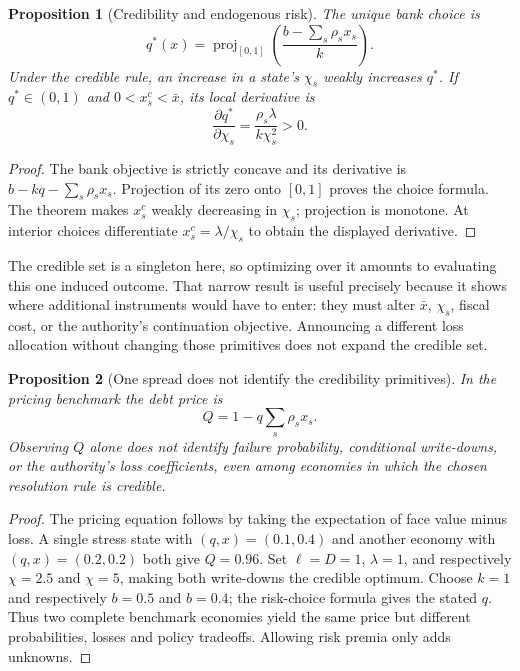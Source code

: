 \documentclass[11pt]{article}
\newtheorem{proposition}{Proposition}
\theoremstyle{definition}
\begin{document}
\begin{proposition}[Credibility and endogenous risk]
The unique bank choice is
\[
 q^*(x)=\operatorname{proj}_{[0,1]}
 \left(\frac{b-\sum_s\rho_sx_s}{k}\right).
\]
Under the credible rule, an increase in a state's $\chi_s$ weakly increases $q^*$. If $q^*\in(0,1)$ and $0<x_s^c<\bar x$, its local derivative is
\[
 \frac{\partial q^*}{\partial\chi_s}
       =\frac{\rho_s\lambda}{k\chi_s^2}>0.
\]
\end{proposition}
\begin{proof}
The bank objective is strictly concave and its derivative is $b-kq-\sum_s\rho_sx_s$. Projection of its zero onto $[0,1]$ proves the choice formula. The theorem makes $x_s^c$ weakly decreasing in $\chi_s$; projection is monotone. At interior choices differentiate $x_s^c=\lambda/\chi_s$ to obtain the displayed derivative.
\end{proof}
The credible set is a singleton here, so optimizing over it amounts to evaluating this one induced outcome. That narrow result is useful precisely because it shows where additional instruments would have to enter: they must alter $\bar x$, $\chi_s$, fiscal cost, or the authority's continuation objective. Announcing a different loss allocation without changing those primitives does not expand the credible set.

\begin{proposition}[One spread does not identify the credibility primitives]
In the pricing benchmark the debt price is
\[
 Q=1-q\sum_s\rho_sx_s.
\]
Observing $Q$ alone does not identify failure probability, conditional write-downs, or the authority's loss coefficients, even among economies in which the chosen resolution rule is credible.
\end{proposition}
\begin{proof}
The pricing equation follows by taking the expectation of face value minus loss. A single stress state with $(q,x)=(0.1,0.4)$ and another economy with $(q,x)=(0.2,0.2)$ both give $Q=0.96$. Set $\ell=D=1$, $\lambda=1$, and respectively $\chi=2.5$ and $\chi=5$, making both write-downs the credible optimum. Choose $k=1$ and respectively $b=0.5$ and $b=0.4$; the risk-choice formula gives the stated $q$. Thus two complete benchmark economies yield the same price but different probabilities, losses and policy tradeoffs. Allowing risk premia only adds unknowns.
\end{proof}
\end{document}
